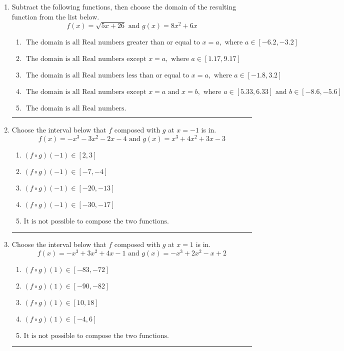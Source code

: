 \documentclass[14pt]{extbook}
\newcommand{\litem}[1]{\item#1\hspace*{-1cm}\rule{\textwidth}{0.4pt}}
\begin{document}
\begin{enumerate}
{\begin{enumerate}[label=\Alph*.]
\end{enumerate} }
\litem{
Subtract the following functions, then choose the domain of the resulting function from the list below.\[ f(x) = \sqrt{5x+26}  \text{ and } g(x) = 8x^{2} +6 x \]\begin{enumerate}[label=\Alph*.]
\item \( \text{ The domain is all Real numbers greater than or equal to } x = a, \text{ where } a \in [-6.2, -3.2] \)
\item \( \text{ The domain is all Real numbers except } x = a, \text{ where } a \in [1.17, 9.17] \)
\item \( \text{ The domain is all Real numbers less than or equal to } x = a, \text{ where } a \in [-1.8, 3.2] \)
\item \( \text{ The domain is all Real numbers except } x = a \text{ and } x = b, \text{ where } a \in [5.33, 6.33] \text{ and } b \in [-8.6, -5.6] \)
\item \( \text{ The domain is all Real numbers. } \)

\end{enumerate} }
\litem{
Choose the interval below that $f$ composed with $g$ at $x=-1$ is in.\[ f(x) = -x^{3} -3 x^{2} -2 x -4 \text{ and } g(x) = x^{3} +4 x^{2} +3 x -3 \]\begin{enumerate}[label=\Alph*.]
\item \( (f \circ g)(-1) \in [2, 3] \)
\item \( (f \circ g)(-1) \in [-7, -4] \)
\item \( (f \circ g)(-1) \in [-20, -13] \)
\item \( (f \circ g)(-1) \in [-30, -17] \)
\item \( \text{It is not possible to compose the two functions.} \)

\end{enumerate} }
\litem{
Choose the interval below that $f$ composed with $g$ at $x=1$ is in.\[ f(x) = -x^{3} +3 x^{2} +4 x -1 \text{ and } g(x) = -x^{3} +2 x^{2} -x + 2 \]\begin{enumerate}[label=\Alph*.]
\item \( (f \circ g)(1) \in [-83, -72] \)
\item \( (f \circ g)(1) \in [-90, -82] \)
\item \( (f \circ g)(1) \in [10, 18] \)
\item \( (f \circ g)(1) \in [-4, 6] \)
\item \( \text{It is not possible to compose the two functions.} \)


\end{enumerate}}
\end{enumerate}
\end{document}
